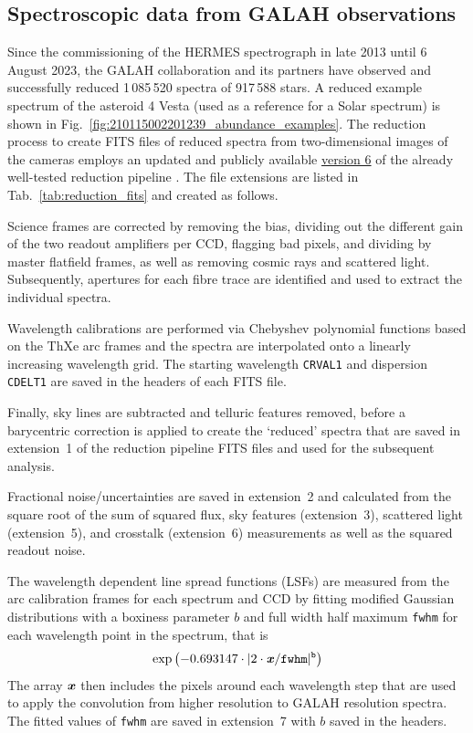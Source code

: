 \documentclass[
  journal=pasa,
  manuscript=research-paper, %
  year=2024,
  volume=37
]{cup-journal}
\newcommand{\allstarnumber}{917\,588\xspace}
\newcommand{\allspecnumber}{1\,085\,520\xspace}
\begin{document}
\subsection{Spectroscopic data from GALAH observations}
\label{sec:spectroscopic_data_from_galah_observations}

Since the commissioning of the HERMES spectrograph in late 2013 until 6 August 2023, the GALAH collaboration and its partners have observed and successfully reduced \allspecnumber spectra of \allstarnumber stars. A reduced example spectrum of the asteroid 4 Vesta (used as a reference for a Solar spectrum) is shown in Fig.~\ref{fig:210115002201239_abundance_examples}. The reduction process to create FITS files of reduced spectra from two-dimensional images of the cameras employs an updated and publicly available \href{https://github.com/sheliak/galah_reduction/blob/master/extract6.0.py}{version 6} of the already well-tested reduction pipeline \citep{Kos2017}. The file extensions are listed in Tab.~\ref{tab:reduction_fits} and created as follows.

Science frames are corrected by removing the bias, dividing out the different gain of the two readout amplifiers per CCD, flagging bad pixels, and dividing by master flatfield frames, as well as removing cosmic rays and scattered light. Subsequently, apertures for each fibre trace are identified and used to extract the individual spectra. 

Wavelength calibrations are performed via Chebyshev polynomial functions based on the ThXe arc frames and the spectra are interpolated onto a linearly increasing wavelength grid. The starting wavelength \texttt{CRVAL1} and dispersion \texttt{CDELT1} are saved in the headers of each FITS file.

Finally, sky lines are subtracted and telluric features removed, before a barycentric correction is applied to create the `reduced' spectra that are saved in extension~1 of the reduction pipeline FITS files and used for the subsequent analysis. 

Fractional noise/uncertainties are saved in extension~2 and calculated from the square root of the sum of squared flux, sky features (extension~3), scattered light (extension~5), and crosstalk (extension~6) measurements as well as the squared readout noise.

The wavelength dependent line spread functions (LSFs) are measured from the arc calibration frames for each spectrum and CCD by fitting modified Gaussian distributions with a boxiness parameter $b$ and full width half maximum \texttt{fwhm} for each wavelength point in the spectrum, that is
\begin{align}
    \exp \left(-0.693147 \cdot \vert 2 \cdot \textbf{\textit{x}}/\texttt{fwhm} \vert^\texttt{b}\right) \label{eq:lsf}
\end{align}
The array $\textbf{\textit{x}}$ then includes the pixels around each wavelength step that are used to apply the convolution from higher resolution to GALAH resolution spectra. The fitted values of \texttt{fwhm} are saved in extension~7 with $b$ saved in the headers.
\end{document}
